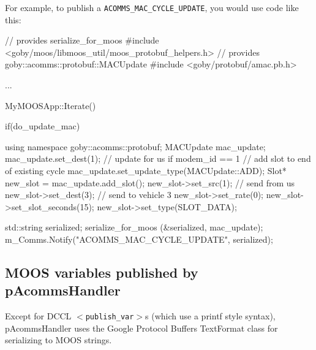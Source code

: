 \documentclass[11pt, letterpaper, oneside]{memoir}
\newcommand{\xmltag}[1]{\texttt{$<$#1$>$}}
\begin{document}
For example, to publish a \verb|ACOMMS_MAC_CYCLE_UPDATE|, you would use code like this:
\begin{boxedverbatim}
// provides serialize_for_moos
#include <goby/moos/libmoos_util/moos_protobuf_helpers.h>
// provides goby::acomms::protobuf::MACUpdate
#include <goby/protobuf/amac.pb.h>

...

MyMOOSApp::Iterate()
{
  if(do_update_mac)
  { 
    using namespace goby::acomms::protobuf;
    MACUpdate mac_update;
    mac_update.set_dest(1); // update for us if modem_id == 1
    // add slot to end of existing cycle
    mac_update.set_update_type(MACUpdate::ADD);
    Slot* new_slot = mac_update.add_slot();
    new_slot->set_src(1);  // send from us
    new_slot->set_dest(3); // send to vehicle 3
    new_slot->set_rate(0);
    new_slot->set_slot_seconds(15);
    new_slot->set_type(SLOT_DATA);
    
    std::string serialized;
    serialize_for_moos (&serialized, mac_update);
    m_Comms.Notify("ACOMMS_MAC_CYCLE_UPDATE", serialized);
  }
}
\end{boxedverbatim}
\resetbvlinenumber

\subsection{MOOS variables published by pAcommsHandler}

Except for DCCL \xmltag{publish\_var}s (which use a printf style syntax), pAcommsHandler uses the Google Protocol Buffers TextFormat class for serializing to MOOS strings. 
\end{document}
